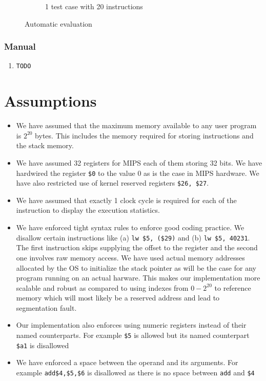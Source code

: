 \documentclass[hidelinks,12pt]{article}
\begin{document}
\begin{figure}[H]
\begin{subfigure}[t]{\textwidth}
        \caption{1 test case with 20 instructions}
    \end{subfigure}
    \caption{Automatic evaluation}
\end{figure}

\subsubsection{Manual}
\begin{enumerate}
    \item \verb|TODO|
\end{enumerate}


\section{Assumptions}
\begin{itemize}
    \item We have assumed that the maximum memory available to any user program is $2^{20}$ bytes. This includes the memory required for storing instructions and the stack memory.
    \item We have assumed 32 registers for MIPS each of them storing 32 bits. We have hardwired the register \verb|$0| to the value $0$ as is the case in MIPS hardware. We have also restricted use of kernel reserved registers \verb|$26, $27|.
    \item We have assumed that exactly 1 clock cycle is required for each of the instruction to display the execution statistics.
    \item We have enforced tight syntax rules to enforce good coding practice. We disallow certain instructions like (a) \verb|lw $5, ($29)| and (b) \verb|lw $5, 40231|.
          The first instruction skips supplying the offset to the register and the second one involves raw memory access. We have used actual memory addresses allocated by the OS to initialize the stack pointer as will be the case for any program running on an actual harware.
          This makes our implementation more scalable and robust as compared to using indexes from $0 - 2^{20}$ to reference memory which will most likely be a reserved address and lead to segmentation fault.
    \item Our implementation also enforces using numeric registers instead of their named counterparts. For example \verb|$5| is allowed but its named counterpart \verb|$a1| is disallowed
    \item We have enforced a space between the operand and its arguments. For example \verb|add$4,$5,$6| is disallowed as there is no space between \verb|add| and \verb|$4|
\end{itemize}
\end{document}

